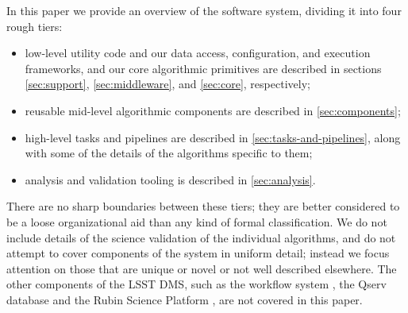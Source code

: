 In this paper we provide an overview of the software system, dividing it into four rough tiers:
\begin{itemize}
\item low-level utility code and our data access, configuration, and execution frameworks, and our core algorithmic primitives are described in sections \ref{sec:support}, \ref{sec:middleware}, and \ref{sec:core}, respectively;
\item reusable mid-level algorithmic components are described in \ref{sec:components};
\item high-level tasks and pipelines are described in \ref{sec:tasks-and-pipelines}, along with some of the details of the algorithms specific to them;
\item analysis and validation tooling is described in \ref{sec:analysis}.
\end{itemize}
There are no sharp boundaries between these tiers; they are better considered to be a loose organizational aid than any kind of formal classification.
We do not include details of the science validation of the individual algorithms, and do not attempt to cover components of the system in uniform detail; instead we focus attention on those that are unique or novel or not well described elsewhere.
The other components of the LSST DMS, such as the workflow system \citep{2022arXiv221115795G,2024EPJWC.29504026K}, the Qserv database \citep{Wang:2011:QDS:2063348.2063364,C15_adassxxxii} and the Rubin Science Platform \citep{LSE-319,2024ASPC..535..227O}, are not covered in this paper.
